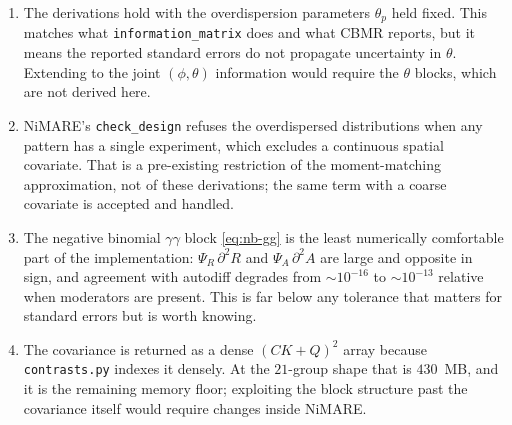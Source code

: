 \documentclass[11pt,a4paper]{article}
\theoremstyle{plain}
\theoremstyle{definition}
\begin{document}
\begin{enumerate}
  \item The derivations hold with the overdispersion parameters $\theta_p$ held fixed. This
        matches what \texttt{information\_matrix} does and what CBMR reports, but it means the
        reported standard errors do not propagate uncertainty in $\theta$. Extending to the joint
        $(\phi,\theta)$ information would require the $\theta$ blocks, which are not derived here.
  \item NiMARE's \texttt{check\_design} refuses the overdispersed distributions when any pattern
        has a single experiment, which excludes a continuous spatial covariate. That is a
        pre-existing restriction of the moment-matching approximation, not of these derivations;
        the same term with a coarse covariate is accepted and handled.
  \item The negative binomial $\gamma\gamma$ block \eqref{eq:nb-gg} is the least numerically
        comfortable part of the implementation: $\Psi_R\,\partial^2R$ and $\Psi_A\,\partial^2A$ are
        large and opposite in sign, and agreement with autodiff degrades from $\sim\!10^{-16}$ to
        $\sim\!10^{-13}$ relative when moderators are present. This is far below any tolerance
        that matters for standard errors but is worth knowing.
  \item The covariance is returned as a dense $(CK+Q)^2$ array because
        \texttt{contrasts.py} indexes it densely. At the $21$-group shape that is $430$~MB, and it
        is the remaining memory floor; exploiting the block structure past the covariance itself
        would require changes inside NiMARE.
\end{enumerate}

\clearpage

\end{document}
